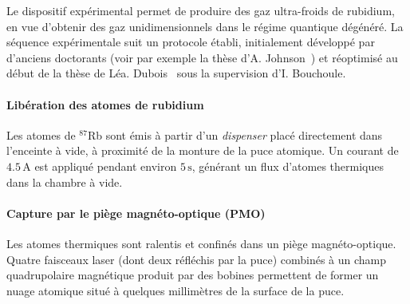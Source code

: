 Le dispositif expérimental permet de produire des gaz ultra-froids de rubidium, en vue d’obtenir des gaz unidimensionnels dans le régime quantique dégénéré. La séquence expérimentale suit un protocole établi, initialement développé par d’anciens doctorants (voir par exemple la thèse d’A. Johnson~\cite{Johnson2016}) et réoptimisé au début de la thèse de Léa. Dubois~\cite{L.Dubois2024} sous la supervision d’I. Bouchoule.


\paragraph{Libération des atomes de rubidium}
Les atomes de $^{87}$Rb sont émis à partir d’un \emph{dispenser} placé directement dans l’enceinte à vide, à proximité de la monture de la puce atomique. Un courant de \( 4.5\,\mathrm{A} \)  est appliqué pendant environ \( 5\,\mathrm{s} \), générant un flux d’atomes thermiques dans la chambre à vide.

%

\paragraph{Capture par le piège magnéto-optique (PMO)}
Les atomes thermiques sont ralentis et confinés dans un piège magnéto-optique. Quatre faisceaux laser (dont deux réfléchis par la puce) combinés à un champ quadrupolaire magnétique produit par des bobines permettent de former un nuage atomique situé à quelques millimètres de la surface de la puce.

